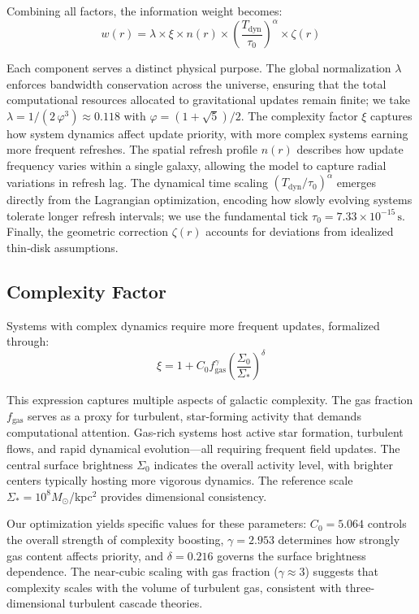 \documentclass[twocolumn,prd,amsmath,amssymb,aps,superscriptaddress,nofootinbib]{revtex4-2}
\begin{document}
Combining all factors, the information weight becomes:
\begin{equation}
w(r) = \lambda \times \xi \times n(r) \times \left(\frac{T_{\text{dyn}}}{\tau_0}\right)^\alpha \times \zeta(r)
\end{equation}

Each component serves a distinct physical purpose. The global normalization $\lambda$ enforces bandwidth conservation across the universe, ensuring that the total computational resources allocated to gravitational updates remain finite; we take $\lambda = 1/(2\,\varphi^3) \approx 0.118$ with $\varphi = (1+\sqrt5)/2$. The complexity factor $\xi$ captures how system dynamics affect update priority, with more complex systems earning more frequent refreshes. The spatial refresh profile $n(r)$ describes how update frequency varies within a single galaxy, allowing the model to capture radial variations in refresh lag. The dynamical time scaling $(T_{\text{dyn}}/\tau_0)^\alpha$ emerges directly from the Lagrangian optimization, encoding how slowly evolving systems tolerate longer refresh intervals; we use the fundamental tick $\tau_0 = 7.33\times10^{-15}\,\mathrm{s}$. Finally, the geometric correction $\zeta(r)$ accounts for deviations from idealized thin‑disk assumptions.

\subsection{Complexity Factor}

Systems with complex dynamics require more frequent updates, formalized through:
\begin{equation}
\xi = 1 + C_0 f_{\text{gas}}^\gamma \left(\frac{\Sigma_0}{\Sigma_*}\right)^\delta
\end{equation}

This expression captures multiple aspects of galactic complexity. The gas fraction $f_{\text{gas}}$ serves as a proxy for turbulent, star-forming activity that demands computational attention. Gas-rich systems host active star formation, turbulent flows, and rapid dynamical evolution---all requiring frequent field updates. The central surface brightness $\Sigma_0$ indicates the overall activity level, with brighter centers typically hosting more vigorous dynamics. The reference scale $\Sigma_* = 10^8 M_\odot$/kpc$^2$ provides dimensional consistency.

Our optimization yields specific values for these parameters: $C_0 = 5.064$ controls the overall strength of complexity boosting, $\gamma = 2.953$ determines how strongly gas content affects priority, and $\delta = 0.216$ governs the surface brightness dependence. The near-cubic scaling with gas fraction ($\gamma \approx 3$) suggests that complexity scales with the volume of turbulent gas, consistent with three-dimensional turbulent cascade theories.
\end{document}
